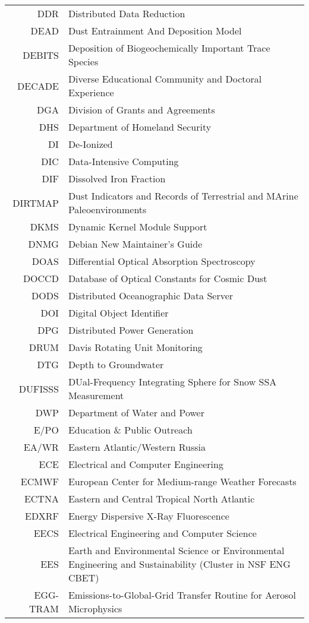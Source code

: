 \documentclass[12pt,twoside]{article}
\begin{document}
\begin{longtable}[>{\bfseries}l]{>{\ttfamily}r l}
DDR & Distributed Data Reduction \\
DEAD & Dust Entrainment And Deposition Model \\
DEBITS & Deposition of Biogeochemically Important Trace Species \\
DECADE & Diverse Educational Community and Doctoral Experience \\
DGA & Division of Grants and Agreements \\
DHS & Department of Homeland Security \\
DI & De-Ionized \\
DIC & Data-Intensive Computing \\
DIF & Dissolved Iron Fraction \\
DIRTMAP & Dust Indicators and Records of Terrestrial and MArine Paleoenvironments \\
DKMS & Dynamic Kernel Module Support \\
DNMG & Debian New Maintainer's Guide \\
DOAS & Differential Optical Absorption Spectroscopy \\
DOCCD & Database of Optical Constants for Cosmic Dust \\
DODS & Distributed Oceanographic Data Server \\
DOI & Digital Object Identifier \\
DPG & Distributed Power Generation \\
DRUM & Davis Rotating Unit Monitoring \\
DTG & Depth to Groundwater \\
DUFISSS & DUal-Frequency Integrating Sphere for Snow SSA Measurement \\
DWP & Department of Water and Power \\
E/PO & Education \& Public Outreach \\
EA/WR & Eastern Atlantic/Western Russia \\
ECE & Electrical and Computer Engineering \\
ECMWF & European Center for Medium-range Weather Forecasts \\
ECTNA & Eastern and Central Tropical North Atlantic \\
EDXRF & Energy Dispersive X-Ray Fluorescence \\
EECS & Electrical Engineering and Computer Science \\
EES & Earth and Environmental Science or Environmental Engineering and Sustainability (Cluster in NSF ENG CBET) \\
EGG-TRAM & Emissions-to-Global-Grid Transfer Routine for Aerosol Microphysics \\

\end{longtable}
\end{document}
